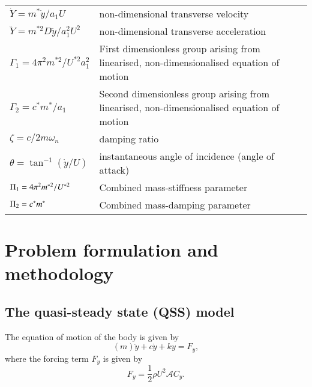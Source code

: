 \begin{tabular}{ll}
$\dot{Y}=m^*\dot{y}/a_1U$ & non-dimensional transverse velocity \\
$\ddot{Y}=m^{*2}D\ddot{y}/a_1^2U^2$ & non-dimensional transverse acceleration \\
$\Gamma_1 = 4\pi^2m^{*2}/U^{*2}a_1^2$ & First dimensionless group arising from linearised, non-dimensionalised equation of motion\\
$\Gamma_2 = c^*m^*/a_1$ & Second dimensionless group arising from linearised, non-dimensionalised equation of motion\\
$\zeta= c/2 m \omega_n$ & damping ratio \\
$\theta= \tan^{-1}{(\dot{y}/U)}$ & instantaneous angle of incidence (angle of attack)\\
$\Pi_1 =  4\pi^2m^{*2}/U^{*2}$ & Combined mass-stiffness parameter\\
$\Pi_2 = c^*m^*$ & Combined mass-damping parameter\\
\end{tabular}  



\section{Problem formulation and methodology}
\label{sec:theory}

\subsection{The quasi-steady state (QSS) model}

The equation of motion of the body is given by 
\begin{equation}
\label{equationofmotion}
(m)\ddot{y}+c\dot{y}+ky=F_y,
\end{equation}
where the forcing term $F_y$ is given by
\begin{equation}
\label{lift equation}
F_y=\frac{1}{2}\rho U^2\mathcal{A}C_y.
\end{equation}




